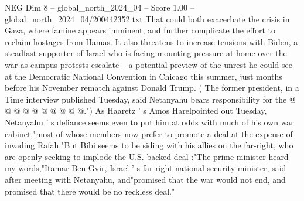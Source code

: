 \begin{textsample}{NEG Dim 8 – global\_north\_2024\_04 – Score 1.00 – global\_north\_2024\_04/200442352.txt}
That could both exacerbate the crisis in Gaza, where famine appears imminent, and further complicate the effort to reclaim hostages from Hamas.
It also threatens to increase tensions with Biden, a steadfast supporter of Israel who is facing mounting pressure at home over the war as campus protests escalate -- a potential preview of the unrest he could see at the Democratic National Convention in Chicago this summer, just months before his November rematch against Donald Trump. ( The former president, in a Time interview published Tuesday, said Netanyahu bears responsibility for the @ @ @ @ @ @ @ @ @ @.") As Haaretz ' s Amos Harelpointed out Tuesday, Netanyahu ' s defiance seems even to put him at odds with much of his own war cabinet,"most of whose members now prefer to promote a deal at the expense of invading Rafah."But Bibi seems to be siding with his allies on the far-right, who are openly seeking to implode the U.S.-backed deal :"The prime minister heard my words,"Itamar Ben Gvir, Israel ' s far-right national security minister, said after meeting with Netanyahu, and"promised that the war would not end, and promised that there would be no reckless deal."

\end{textsample}
